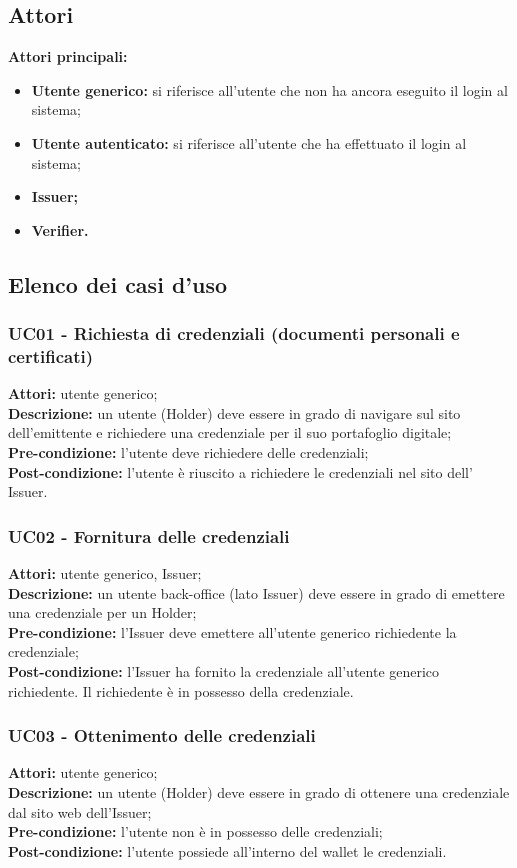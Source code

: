 \subsection{Attori}
\textbf{Attori principali:}
\begin{itemize}
    \item\textbf{Utente generico:} si riferisce all’utente che non ha ancora eseguito il login al sistema;
    \item\textbf{Utente autenticato:} si riferisce all’utente che ha effettuato il login al sistema;
    \item\textbf{Issuer;}
    \item\textbf{Verifier.}
\end{itemize}


\subsection{Elenco dei casi d'uso}
\subsubsection{UC01 - Richiesta di credenziali (documenti personali e certificati)}
\textbf{Attori:} utente generico;\\
\textbf{Descrizione:} un utente (Holder) deve essere in grado di navigare sul sito dell'emittente e richiedere una credenziale per il suo portafoglio digitale; \\
\textbf{Pre-condizione:} l’utente deve richiedere delle credenziali;\\
\textbf{Post-condizione:} l’utente è riuscito a richiedere le credenziali nel sito dell’ Issuer.

\subsubsection{UC02 - Fornitura delle credenziali}
\textbf{Attori:} utente generico, Issuer;\\
\textbf{Descrizione:} un utente back-office (lato Issuer) deve essere in grado di emettere una credenziale per un Holder;\\
\textbf{Pre-condizione:} l’Issuer deve emettere all’utente generico richiedente la credenziale;\\
\textbf{Post-condizione:} l’Issuer ha fornito la credenziale all'utente generico richiedente. Il richiedente è in possesso della credenziale.

\subsubsection{UC03 - Ottenimento delle credenziali}
\textbf{Attori:} utente generico;\\
\textbf{Descrizione:} un utente (Holder) deve essere in grado di ottenere una credenziale dal sito web dell'Issuer;\\
\textbf{Pre-condizione:} l’utente non è in possesso delle credenziali;\\
\textbf{Post-condizione:} l’utente possiede all’interno del wallet le credenziali.


